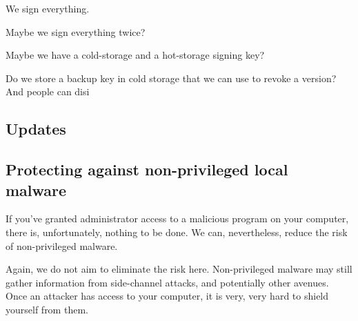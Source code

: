 We sign everything.

Maybe we sign everything twice?

Maybe we have a cold-storage and a hot-storage signing key?

Do we store a backup key in cold storage that we can use to revoke a version? And people can disi


\subsection{Updates}


\subsection{Protecting against non-privileged local malware}

If you've granted administrator access to a malicious program on your computer, there is, unfortunately, nothing to be done. We can, nevertheless, reduce the risk of non-privileged malware. 


Again, we do not aim to eliminate the risk here. Non-privileged malware may still gather information from side-channel attacks, and potentially other avenues. Once an attacker has access to your computer, it is very, very hard to shield yourself from them.